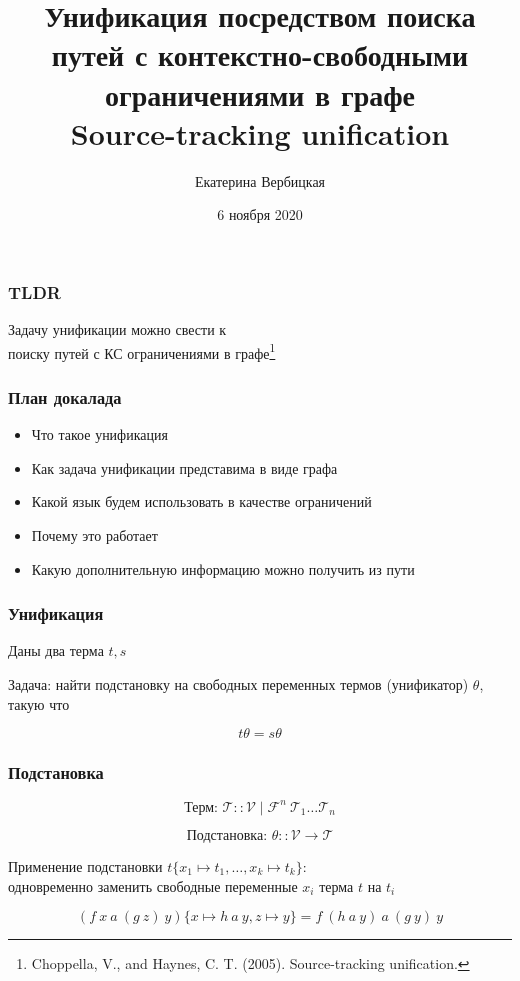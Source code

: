 \documentclass{beamer}
\title[]{Унификация посредством поиска путей с контекстно-свободными ограничениями в графе \\ Source-tracking unification}
\subtitle[]{}
\institute[]{
Лаборатория языковых инструментов JetBrains\\
}
\author[]{Екатерина Вербицкая}
\date{6 ноября 2020}
\begin{document}
{
  \begin{frame}
    \titlepage
  \end{frame}
}


\begin{frame}[fragile]
  \frametitle{TLDR}
\begin{center}
  Задачу унификации можно свести к \\ поиску путей с КС ограничениями в графе\footnote{Choppella, V., and Haynes, C. T. (2005). Source-tracking unification.}
\end{center}
\end{frame}

\begin{frame}[fragile]
  \frametitle{План докалада}
\begin{itemize}
  \item Что такое унификация
  \item Как задача унификации представима в виде графа
  \item Какой язык будем использовать в качестве ограничений
  \item Почему это работает
  \item Какую дополнительную информацию можно получить из пути
\end{itemize}

\end{frame}

\begin{frame}[fragile]
  \frametitle{Унификация}

  \begin{center}
    Даны два терма $t, s$
  \end{center}

  \begin{center}
    Задача: найти подстановку на свободных переменных термов (унификатор) $\theta$, такую что
  \end{center}
  \[
    t \theta = s \theta
  \]
\end{frame}


\begin{frame}[fragile]
  \frametitle{Подстановка}
  \[
    \text{Терм: } \mathcal{T} :: \mathcal{V} \mid \mathcal{F}^n \ \mathcal{T}_1 \dots \mathcal{T}_n
  \]

  \[
    \text{Подстановка: } \theta :: \mathcal{V} \to \mathcal{T}
  \]


  \begin{center}
    Применение подстановки $t\{x_1 \mapsto t_1, \dots, x_k \mapsto t_k\}$: \\ одновременно заменить свободные переменные $x_i$ терма $t$ на $t_i$
  \end{center}
  \[
     (f \ x \ a \ (g \ z) \ y)\{x \mapsto h \ a \ y, z \mapsto y\} = f \ (h \ a  \ y) \ a \ (g \ y) \ y
  \]
\end{frame}
\end{document}
